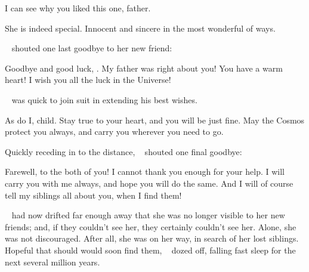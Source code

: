 \documentclass[main.tex]{subfiles}
\begin{document}
\newpara \Hippe I can see why you liked this one, father.

\newpara \Chiron She is indeed special.  Innocent and sincere in the most wonderful of ways.

\newpara \nar \rmhippe~ shouted one last goodbye to her new friend:

\newpara \Hippe Goodbye and good luck, \rmelectra.  My father was right about you!  You have a warm heart!  I wish you all the luck in the Universe!

\newpara \nar \rmchiron~ was quick to join suit in extending his best wishes.

\newpara \Chiron As do I, child.  Stay true to your heart, and you will be just fine.  May the Cosmos protect you always, and carry you wherever you need to go.

\newpara \nar Quickly receding in to the distance, \rmelectra~ shouted one final goodbye:

\newpara \Electra Farewell, to the both of you!  I cannot thank you enough for your help.  I will carry you with me always, and hope you will do the same.  And I will of course tell my siblings all about you, when I find them!

\newpara \nar \rmelectra~ had now drifted far enough away that she was no longer visible to her new friends; and, if they couldn't see her, they certainly couldn't see her.  Alone, she was not discouraged.  After all, she was on her way, in search of her lost siblings.  Hopeful that should would soon find them, \rmelectra~ dozed off, falling fast sleep for the next several million years.


\end{document}

